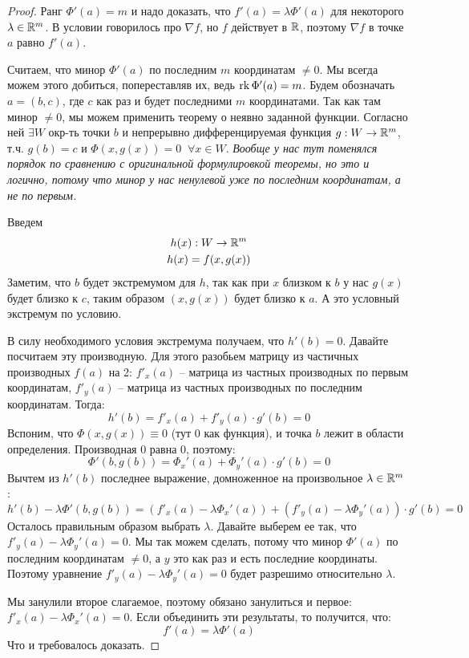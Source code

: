 \begin{proof}
    Ранг $\Phi'(a) = m$ и надо доказать, что $f'(a) = \lambda \Phi'(a)$ для некоторого $\lambda \in \mathbb{R}^m$.
    В условии говорилось про $\nabla f$, но $f$ действует в $\mathbb{R}$, поэтому $\nabla f$ в точке $a$ равно $f'(a)$.

    Считаем, что минор $\Phi'(a)$ по последним $m$ координатам $\neq 0$.
    Мы всегда можем этого добиться, попереставляв их, ведь $\operatorname{rk} \Phi'(a) = m$.
    Будем обозначать $a = (b, c)$, где $c$ как раз и будет последними $m$ координатами.
    Так как там минор $\neq 0$, мы можем применить теорему о неявно заданной функции.
    Согласно ней $\exists W$ окр-ть точки $b$ и непрерывно дифференцируемая функция $g: W \to \mathbb{R}^m$, т.ч. $g(b) = c$ и $\Phi(x, g(x)) = 0 \;\; \forall x \in W$.
    \textit{Вообще у нас тут поменялся порядок по сравнению с оригинальной формулировкой теоремы, но это и логично, потому что минор у нас ненулевой уже по последним координатам, а не по первым.}

    Введем \begin{gather*}
        h(x): W \to \mathbb{R}^m \\ h(x) = f(x, g(x))
    \end{gather*} 
    Заметим, что $b$ будет экстремумом для $h$, так как при $x$ близком к $b$ у нас $g(x)$ будет близко к $c$, таким образом $(x, g(x))$ будет близко к $a$. А это условный экстремум по условию.

    В силу необходимого условия экстремума получаем, что $h'(b) = 0$.
    Давайте посчитаем эту производную. 
    Для этого разобьем матрицу из частичных производных $f(a)$ на 2: $f'_x(a)$ -- матрица из частных производных по первым координатам, $f'_y(a)$ -- матрица из частных производных по последним координатам.
    Тогда: \[ h'(b) = f'_x(a) + f'_y(a) \cdot g'(b) = 0 \]
    Вспоним, что $\Phi(x, g(x)) \equiv 0$ (тут 0 как функция), и точка $b$ лежит в области определения. 
    Производная 0 равна 0, поэтому: \[ \Phi'(b, g(b)) = \Phi_x'(a) + \Phi_y'(a)\cdot g'(b) = 0  \]
    Вычтем из $h'(b)$ последнее выражение, домноженное на произвольное $\lambda \in \mathbb{R}^m$ : \[ h'(b) - \lambda \Phi'(b, g(b)) = (f'_x(a) - \lambda \Phi_x'(a)) + (f'_y(a) - \lambda \Phi_y'(a))\cdot g'(b) = 0  \]
    Осталось правильным образом выбрать $\lambda$. 
    Давайте выберем ее так, что $f'_y(a) - \lambda \Phi_y'(a) = 0$. 
    Мы так можем сделать, потому что  минор $\Phi'(a)$ по последним координатам $\neq 0$, а $y$ это как раз и есть последние координаты.
    Поэтому уравнение $f'_y(a) - \lambda \Phi_y'(a) = 0$ будет разрешимо относительно $\lambda$.

    Мы занулили второе слагаемое, поэтому обязано занулиться и первое: $f'_x(a) - \lambda \Phi_x'(a) = 0$.
    Если объединить эти результаты, то получится, что: \[ f'(a) = \lambda \Phi'(a) \]
    Что и требовалось доказать.
\end{proof}

